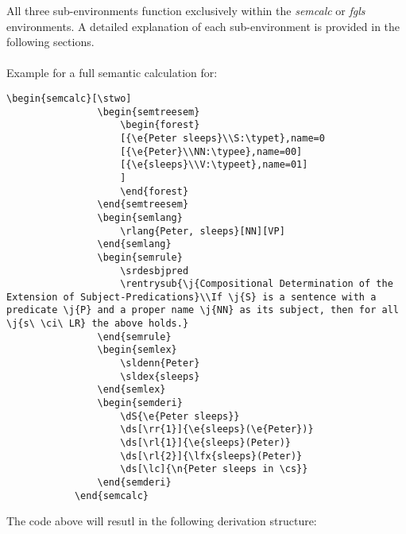 \documentclass[10pt, a4paper]{article}
\begin{document}
	All three sub-environments function exclusively within the \textit{semcalc} or \textit{fgls} environments. A detailed explanation of each sub-environment is provided in the following sections.
	\\\ \\Example for a full semantic calculation for: 
	\begin{lstlisting}[style=B]
			\begin{semcalc}[\stwo]
				\begin{semtreesem}
					\begin{forest}
					[{\e{Peter sleeps}\\S:\typet},name=0
					[{\e{Peter}\\NN:\typee},name=00]
					[{\e{sleeps}\\V:\typeet},name=01]
					]
					\end{forest}
				\end{semtreesem}
				\begin{semlang}
					\rlang{Peter, sleeps}[NN][VP]
				\end{semlang}
				\begin{semrule}
					\srdesbjpred
					\rentrysub{\j{Compositional Determination of the Extension of Subject-Predications}\\If \j{S} is a sentence with a predicate \j{P} and a proper name \j{NN} as its subject, then for all \j{s\ \ci\ LR} the above holds.}
				\end{semrule}
				\begin{semlex}
					\sldenn{Peter}
					\sldex{sleeps}
				\end{semlex}
				\begin{semderi}
					\dS{\e{Peter sleeps}}
					\ds[\rr{1}]{\e{sleeps}(\e{Peter})}
					\ds[\rl{1}]{\e{sleeps}(Peter)}
					\ds[\rl{2}]{\lfx{sleeps}(Peter)}
					\ds[\lc]{\n{Peter sleeps in \cs}}
				\end{semderi}
			\end{semcalc}
	\end{lstlisting}
	The code above will resutl in the following derivation structure:
\end{document}
